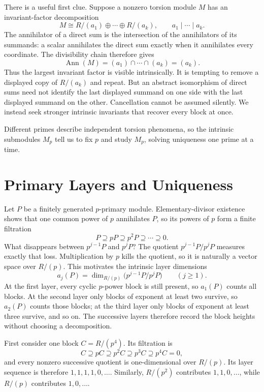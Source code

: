 There is a useful first clue. Suppose a nonzero torsion module \(M\) has an
invariant-factor decomposition
\[
M\cong R/(a_1)\oplus\cdots\oplus R/(a_k),
\qquad a_1\mid\cdots\mid a_k.
\]
The annihilator of a direct sum is the intersection of the annihilators of
its summands: a scalar annihilates the direct sum exactly when it annihilates
every coordinate. The divisibility chain therefore gives
\[
\operatorname{Ann}(M)=(a_1)\cap\cdots\cap(a_k)=(a_k).
\]
Thus the largest invariant factor is visible intrinsically.  It is tempting
to remove a displayed copy of \(R/(a_k)\) and repeat.  But an abstract
isomorphism of direct sums need not identify the last displayed summand on
one side with the last displayed summand on the other.  Cancellation cannot
be assumed silently.  We instead seek stronger intrinsic invariants that
recover every block at once.

Different primes describe independent torsion phenomena, so the intrinsic
submodules \(M_p\) tell us to fix \(p\) and study \(M_p\), solving uniqueness
one prime at a time.

\section{Primary Layers and Uniqueness}\label{sec:primary-layers}
Let \(P\) be a finitely generated \(p\)-primary module.  Elementary-divisor
existence shows that one common power of \(p\) annihilates \(P\), so its powers
of \(p\) form a finite filtration
\[
P\supseteq pP\supseteq p^2P\supseteq\cdots\supseteq0.
\]
What disappears between \(p^{j-1}P\) and \(p^jP\)?  The quotient
\(p^{j-1}P/p^jP\) measures exactly that loss.  Multiplication by \(p\) kills
the quotient, so it is naturally a vector space over \(R/(p)\).  This
motivates the intrinsic layer dimensions
\[
a_j(P)=\dim_{R/(p)}\bigl(p^{j-1}P/p^jP\bigr)
\qquad(j\geq1).
\]
At the first layer, every cyclic \(p\)-power block is still present, so
\(a_1(P)\) counts all blocks. At the second layer only blocks of exponent at
least two survive, so \(a_2(P)\) counts those blocks; at the third layer only
blocks of exponent at least three survive, and so on. The successive layers
therefore record the block heights without choosing a decomposition.

First consider one block \(C=R/(p^4)\).  Its filtration is
\[
C\supseteq pC\supseteq p^2C\supseteq p^3C\supseteq p^4C=0,
\]
and every nonzero successive quotient is one-dimensional over \(R/(p)\).
Its layer sequence is therefore \(1,1,1,1,0,\ldots\).  Similarly,
\(R/(p^2)\) contributes \(1,1,0,\ldots\), while \(R/(p)\) contributes
\(1,0,\ldots\).


